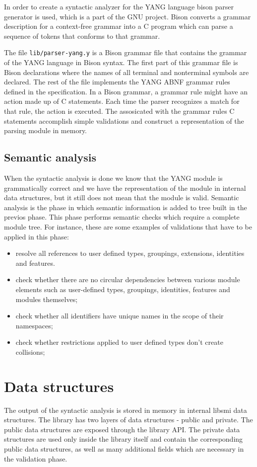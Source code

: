 \documentclass[conference]{IEEEtran}
\begin{document}
In order to create a syntactic analyzer for the YANG language bison parser generator \cite{bib6} is used, which is a part of the GNU project. Bison converts a grammar description for a context-free grammar into a C program which can parse a sequence of tokens that conforms to that grammar. 

The file \texttt{lib/parser-yang.y} is a Bison grammar file that contains the grammar of the YANG language in Bison syntax. The first part of this grammar file is Bison declarations where the names of all terminal and nonterminal symbols are declared. The rest of the file implements the YANG ABNF grammar rules defined in the specification. In a Bison grammar, a grammar rule might have an action made up of C statements. Each time the parser recognizes a match for that rule, the action is executed. The assosicated with the grammar rules C statements accomplish simple validations and construct a representation of the parsing module in memory.

\subsection{Semantic analysis}
When the syntactic analysis is done we know that the YANG module is grammatically correct and we have the representation of the module in internal data structures, but it still does not mean that the  module is valid. Semantic analysis is the phase in which semantic information is added to tree built in the previos phase. This phase performs semantic checks which require a complete module tree. For instance, these are some examples of validations that have to be applied in this phase:
\begin{itemize}
\item resolve all references to user defined types, groupings, extensions, identities and features.
\item check whether there are no
  circular dependencies between various module elements such as user-defined types, groupings, identities, features and modules themselves;
\item check whether all identifiers have unique names in the scope of their namespaces;
\item check whether restrictions applied to user defined types don't create collisions;
\end{itemize}

\section{Data structures}
The output of the syntactic analysis is stored in memory in internal libsmi data structures. The library has two layers of data structures - public and private. The public data structures are exposed through the library API. The private data structures are used only inside the library itself and contain the corresponding public data structures, as well as many additional fields which are necessary in the validation phase. 
\end{document}
